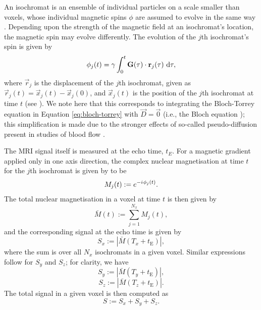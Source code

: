         An isochromat is an ensemble of individual particles on a scale smaller than voxels, whose individual magnetic spins $\phi$ are assumed to evolve in the same way \cite{jungSpinEchoMagnetic2013}. Depending upon the strength of the magnetic field at an isochromat's location, the magnetic spin may evolve differently. The evolution of the $j$th isochromat's spin is given by
        \begin{equation}
            \phi_j(t) = \gamma \int_0^t \boldsymbol{\mathbf{G}}(\tau) \cdot \boldsymbol{\mathbf{r}}_j(\tau) ~\mathrm{d} \tau,
            \label{eq:phi}
        \end{equation}
        where $\vec{r}_j$ is the displacement of the $j$th isochromat, given as $\vec{r}_j(t) = \vec{x}_j(t) - \vec{x}_j(0)$, and $\vec{x}_j(t)$ is the position of the $j$th isochromat at time $t$ (see \cite{bernsteinHandbookMRIPulse2004}). We note here that this corresponds to integrating the Bloch-Torrey equation in Equation \eqref{eq:bloch-torrey} with $\vec{D} = \vec{0}$ (i.e., the Bloch equation \cite{bernsteinHandbookMRIPulse2004}); this simplification is made due to the stronger effects of so-called pseudo-diffusion present in studies of blood flow \cite{torreyBlochEquationsDiffusion1956,lebihanWhatCanWe2019}.
        
        The MRI signal itself is measured at the echo time, $t_E$. For a magnetic gradient applied only in one axis direction, the complex nuclear magnetisation at time $t$ for the $j$th isochromat is given by \cite{bernsteinHandbookMRIPulse2004} to be
        \begin{equation}
            M_j(t) := e^{-{i\mkern1mu}\phi_j(t)}.
        \end{equation}
        The total nuclear magnetisation in a voxel at time $t$ is then given by 
        \begin{equation}
            \bar{M}(t) := \sum^{N_x}_{j=1} M_j(t),
            \label{eq:nuclear-magnetisation}
        \end{equation}
        and the corresponding signal at the echo time is given by
        \begin{equation}
            S_x := \left| \bar{M}(T_x + t_\text{E}) \right|,
            \label{eq:signal-x}
        \end{equation}
        where the sum is over all $N_x$ isochromats in a given voxel. Similar expressions follow for $S_y$ and $S_z$; for clarity, we have
        \begin{equation}
            S_y := \left| \bar{M}(T_y + t_\text{E}) \right|,
        \end{equation}
        \begin{equation}
            S_z := \left| \bar{M}(T_z + t_\text{E}) \right|.
        \end{equation}
        The total signal in a given voxel is then computed as 
        \begin{equation}
            S := S_x + S_y + S_z.
            \label{eq:total-s}
        \end{equation}

